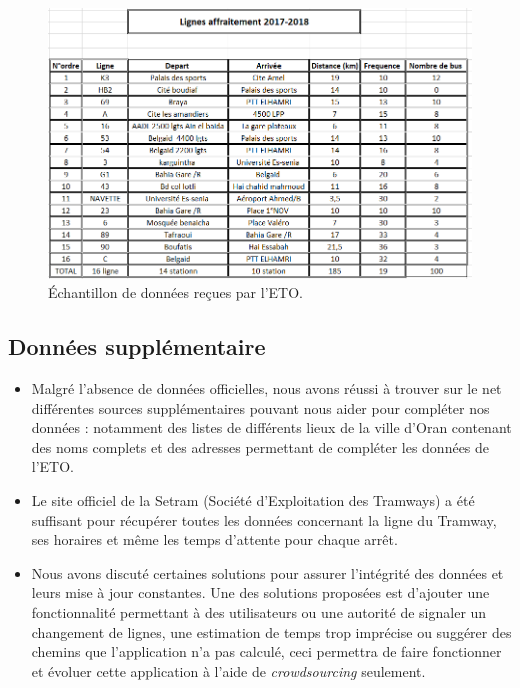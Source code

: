 \begin{figure}
	\center
	\includegraphics[scale=0.7]{img/LignesETO.png}
	\caption{Échantillon de données reçues par l'ETO.}
\end{figure}

\subsection{Données supplémentaire}
	\begin{itemize}
		\item Malgré l'absence de données officielles, nous avons réussi à trouver sur le net différentes sources supplémentaires pouvant nous aider pour compléter nos données : notamment des listes de différents lieux de la ville d'Oran contenant des noms complets et des adresses permettant de compléter les données de l'ETO.
		\item Le site officiel de la Setram (Société d'Exploitation des Tramways) a été suffisant pour récupérer toutes les données concernant la ligne du Tramway, ses horaires et même les temps d'attente pour chaque arrêt.
		\item Nous avons discuté certaines solutions pour assurer l'intégrité des données et leurs mise à jour constantes. Une des solutions proposées est d'ajouter une fonctionnalité permettant à des utilisateurs ou une autorité de signaler un changement de lignes, une estimation de temps trop imprécise ou suggérer des chemins que l'application n'a pas calculé, ceci permettra de faire fonctionner et évoluer cette application à l'aide de \emph{crowdsourcing} seulement.
	\end{itemize}

